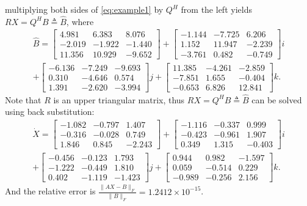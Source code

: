 \documentclass[preprint,12pt]{elsarticle}
\numberwithin{equation}{section}
\begin{document}
multiplying both sides of \eqref{eq:example1} by \(Q^H\) from the left yields \(RX = Q^HB\triangleq\hat{B}\),
where
\begin{align*}
\hat{B} =
\begin{bmatrix}
4.981 & 6.383 & 8.076 \\
-2.019 & -1.922 & -1.440 \\
11.356 & 10.929 & -9.652
\end{bmatrix} +
\begin{bmatrix}
-1.144 & -7.725 & 6.206 \\
1.152 & 11.947 & -2.239 \\
-3.761 & 0.482 & -0.749
\end{bmatrix} i \\+
\begin{bmatrix}
-6.136 & -7.249 & -9.693 \\
0.310 & -4.646 & 0.574 \\
1.391 & -2.620 & -3.994
\end{bmatrix} j +
\begin{bmatrix}
11.385 & -4.261 & -2.859 \\
-7.851 & 1.655 & -0.404 \\
-0.653 & 6.826 & 12.841
\end{bmatrix} k.
\end{align*}
Note that \(R\) is an upper triangular matrix, thus   \(RX = Q^HB\triangleq\hat{B}\)  can be solved using back substitution:
 \begin{align*}
\dot{X} =
\begin{bmatrix}
-1.082 & -0.797 & 1.407 \\
-0.316 & -0.028 & 0.749 \\
1.846 & 0.845 & -2.243
\end{bmatrix} +
\begin{bmatrix}
-1.116 & -0.337 & 0.999 \\
-0.423 & -0.961 & 1.907 \\
0.349 & 1.315 & -0.403
\end{bmatrix} i \\+
\begin{bmatrix}
-0.456 & -0.123 & 1.793 \\
-1.222 & -0.449 & 1.810 \\
0.402 & -1.119 & -1.423
\end{bmatrix} j +
\begin{bmatrix}
0.944 & 0.982 & -1.597 \\
0.059 & -0.514 & 0.229 \\
-0.989 & -0.256 & 2.156
\end{bmatrix} k.
\end{align*}
And the relative error is $\frac{\|AX - B\|_F}{\|B\|_F} = 1.2412\times 10^{-15}$.
\end{document}
